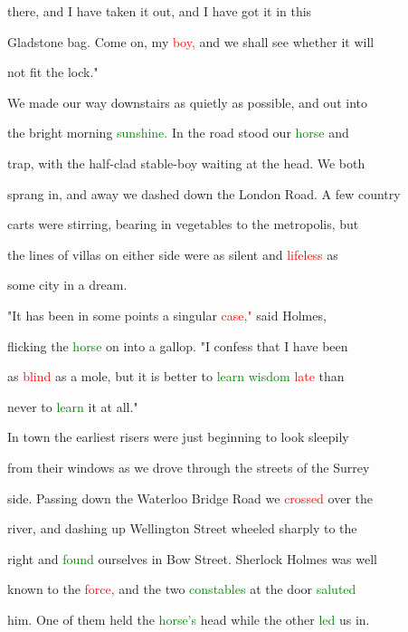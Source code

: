  there, and I have taken it out, and I have got it in this

 Gladstone bag. Come on, my \textcolor{red}{boy,} and we shall see whether it will

 not fit the lock."



 We made our way downstairs as quietly as possible, and out into

 the bright morning \textcolor{green}{sunshine.} In the road stood our \textcolor{green}{horse} and

 trap, with the half-clad stable-boy \textcolor{BurntOrange}{waiting} at the head. We both

 sprang in, and away we dashed down the London Road. A few country

 carts were stirring, bearing in vegetables to the metropolis, but

 the lines of villas on either side were as silent and \textcolor{red}{lifeless} as

 some city in a dream.



 "It has been in some points a singular \textcolor{red}{case,"} said Holmes,

 flicking the \textcolor{green}{horse} on into a gallop. "I \textcolor{BurntOrange}{confess} that I have been

 as \textcolor{red}{blind} as a mole, but it is better to \textcolor{green}{learn} \textcolor{green}{wisdom} \textcolor{red}{late} than

 never to \textcolor{green}{learn} it at all."



 In town the earliest risers were just beginning to look sleepily

 from their windows as we drove through the streets of the Surrey

 side. Passing down the Waterloo Bridge Road we \textcolor{red}{crossed} over the

 river, and dashing up Wellington Street wheeled sharply to the

 right and \textcolor{green}{found} ourselves in Bow Street. Sherlock Holmes was well

 known to the \textcolor{red}{force,} and the two \textcolor{green}{constables} at the door \textcolor{green}{saluted}

 him. One of them held the \textcolor{green}{horse's} head while the other \textcolor{green}{led} us in.



